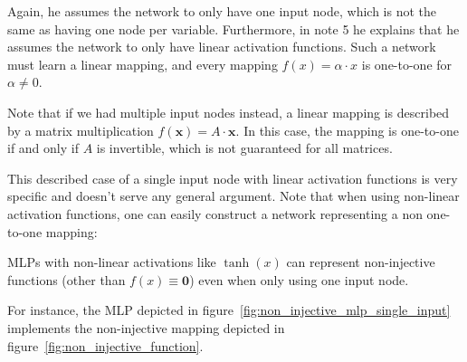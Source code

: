 \documentclass[../../main.tex]{subfiles}
\begin{document}
\begin{critique}
    Again, he assumes the network to only have one input node, which is not the same as having one node per variable. Furthermore, in note 5 he explains that he assumes the network to only have linear activation functions. Such a network must learn a linear mapping, and every mapping $f(x) = \alpha \cdot x$ is one-to-one for $\alpha \neq 0$.

    Note that if we had multiple input nodes instead, a linear mapping is described by a matrix multiplication $f(\bm{x}) = A \cdot \bm{x}$. In this case, the mapping is one-to-one if and only if $A$ is invertible, which is not guaranteed for all matrices.
\end{critique}

\begin{critique}
    This described case of a single input node with linear activation functions is very specific and doesn't serve any general argument. Note that when using non-linear activation functions, one can easily construct a network representing a non one-to-one mapping:

    \begin{example}
        MLPs with non-linear activations like $\tanh(x)$ can represent non-injective functions (other than $f(x) \equiv \bm{0}$) even when only using one input node.
        
        For instance, the MLP depicted in figure~\ref{fig:non_injective_mlp_single_input} implements the non-injective mapping depicted in figure~\ref{fig:non_injective_function}.

        \begin{center}
            \label{fig:non_injective_mlp_single_input}
        \end{center}


\end{example}
\end{critique}
\end{document}
